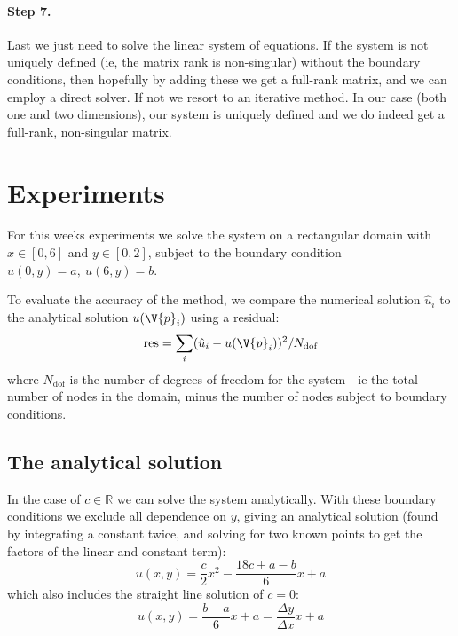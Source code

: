\documentclass[sigconf]{acmart}
\begin{document}
\paragraph{Step 7.} Last we just need to solve the linear system of equations. If the system is not uniquely defined (ie, the matrix rank is non-singular) without the boundary conditions, then hopefully by adding these we get a full-rank matrix, and we can employ a direct solver. If not we resort to an iterative method. In our case (both one and two dimensions), our system is uniquely defined and we do indeed get a full-rank, non-singular matrix.

\section{Experiments}
For this weeks experiments we solve the system on a rectangular domain with $ x \in [0, 6] $ and $ y \in [0, 2] $, subject to the boundary condition $ u(0, y) = a, \ u(6, y) = b $.

To evaluate the accuracy of the method, we compare the numerical solution $ \hat{u}_i $ to the analytical solution $ u(\V{p}_i) $ using a residual:
\begin{equation}\label{key}
	\text{res} = \sum_{i} (\hat{u}_i - u(\V{p}_i))^2/N_{\text{dof}}
\end{equation}
where $ N_{\text{dof}} $ is the number of degrees of freedom for the system - ie the total number of nodes in the domain, minus the number of nodes subject to boundary conditions.

\subsection{The analytical solution}
In the case of $ c\in \mathbb{R} $ we can solve the system analytically. With these boundary conditions we exclude all dependence on $ y $, giving an analytical solution (found by integrating a constant twice, and solving for two known points to get the factors of the linear and constant term):
\begin{equation}\label{key}
	u(x, y) = \frac{c}{2}x^2 - \frac{18c + a - b}{6} x + a
\end{equation}
which also includes the straight line solution of $ c=0 $:
\begin{equation}\label{key}
	u(x,y) = \frac{b-a}{6} x + a = \frac{\Delta y}{\Delta x} x + a
\end{equation}
\end{document}
